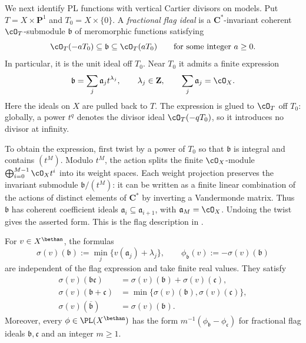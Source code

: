 We next identify PL functions with vertical Cartier divisors on
models. Put $T=X\times\mathbf P^1$ and $T_0=X\times\{0\}$.
A \emph{fractional flag ideal} is a $\mathbf C^*$-invariant
coherent $\cO_T$-submodule $\mathfrak b$ of meromorphic
functions satisfying
\[
 \cO_T(-aT_0)\subseteq\mathfrak b\subseteq\cO_T(aT_0)
 \qquad\text{for some integer }a\geq0.
\]
In particular, it is the unit ideal off $T_0$. Near $T_0$ it
admits a finite expression
\[
 \mathfrak b=\sum_j\mathfrak a_jt^{\lambda_j},\qquad
 \lambda_j\in\mathbf Z,\qquad \sum_j\mathfrak a_j=\cO_X.
\]
Here the ideals on $X$ are pulled back to $T$. The expression
is glued to $\cO_T$ off $T_0$: globally, a power $t^q$ denotes
the divisor ideal $\cO_T(-qT_0)$, so it introduces no divisor
at infinity.

To obtain the expression, first twist by a power of $T_0$ so
that $\mathfrak b$ is integral and contains $(t^M)$. Modulo
$t^M$, the action splits the finite $\cO_X$-module
$\bigoplus_{i=0}^{M-1}\cO_Xt^i$ into its weight spaces.
Each weight projection preserves the invariant submodule
$\mathfrak b/(t^M)$: it can be written as a finite linear
combination of the actions of distinct elements of
$\mathbf C^*$ by inverting a Vandermonde matrix. Thus
$\mathfrak b$ has coherent coefficient ideals
$\mathfrak a_i\subseteq\mathfrak a_{i+1}$, with
$\mathfrak a_M=\cO_X$. Undoing the twist gives the asserted
form. This is the flag description in
\cite[equation~(0.0.6)]{MPTropicalV2}.

\begin{lemma}\label{lem:mp-flag-evaluation}
For $v\in X^{\bethan}$, the formulas
\[
 \sigma(v)(\mathfrak b)
    :=\min_j\{v(\mathfrak a_j)+\lambda_j\},\qquad
 \phi_{\mathfrak b}(v):=-\sigma(v)(\mathfrak b)
\]
are independent of the flag expression and take finite real
values. They satisfy
\[
 \begin{aligned}
 \sigma(v)(\mathfrak b\mathfrak c)
     &=\sigma(v)(\mathfrak b)+\sigma(v)(\mathfrak c),\\
 \sigma(v)(\mathfrak b+\mathfrak c)
     &=\min\{\sigma(v)(\mathfrak b),\sigma(v)(\mathfrak c)\},\\
 \sigma(v)(\overline{\mathfrak b})&=\sigma(v)(\mathfrak b).
 \end{aligned}
\]
Moreover, every $\phi\in\PL(X^{\bethan})$ has the form
$m^{-1}(\phi_{\mathfrak b}-\phi_{\mathfrak c})$ for fractional
flag ideals $\mathfrak b,\mathfrak c$ and an integer $m\geq1$.
\end{lemma}

